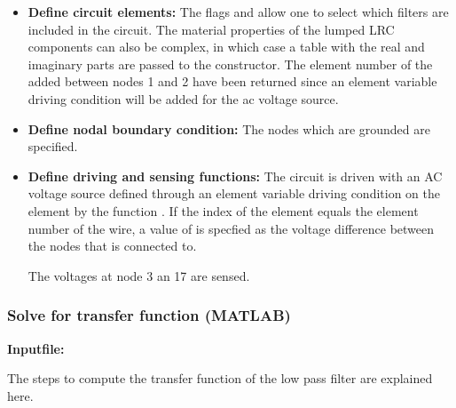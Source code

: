 \begin{itemize}

  \item{\textbf{Define circuit elements:}}
  The flags  and  allow 
  one to select which filters are included in the circuit.
  The material properties of the lumped LRC components can
  also be complex, in which case a table with the real and
  imaginary parts are passed to the 
  constructor. The element number of the  added between
  nodes 1 and 2 have been returned since an element variable driving 
  condition will be added for the ac voltage source.

  \item{\textbf{Define nodal boundary condition:}}
  The nodes which are grounded are specified.

  \item{\textbf{Define driving and sensing functions:}}
  The circuit is driven with an AC voltage source defined 
  through an element variable driving condition on the 
   element by the function . 
  If the index of the
  element  equals the element number  of
  the wire, a value of  is specfied as the voltage
  difference between the nodes that  is connected to. 

  The voltages at node 3 an 17 are sensed. 

\end{itemize}

\clearpage
\subsubsection*{Solve for transfer function (MATLAB)}
\begin{flushleft}
  \textbf{Inputfile:}
  \\
\end{flushleft}
\hspace{1in}
{\footnotesize
{}
}

\clearpage
The steps to compute the transfer function of the low pass
filter are explained here. 

